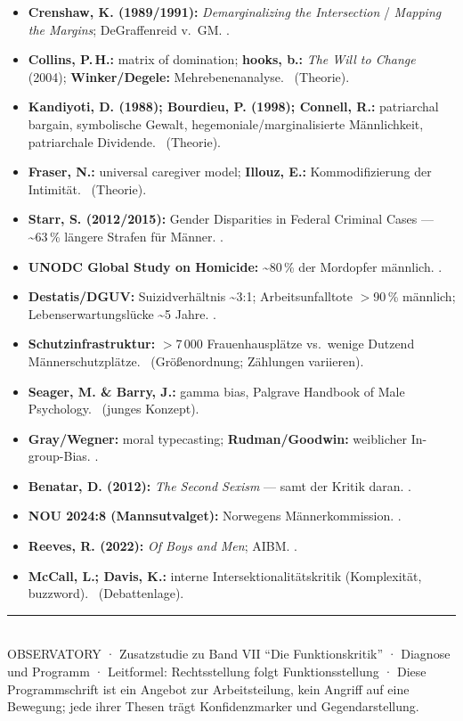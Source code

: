 \begin{itemize}
\item \textbf{Crenshaw, K. (1989/1991):} \textit{Demarginalizing the
Intersection} / \textit{Mapping the Margins}; DeGraffenreid v.\ GM. \belegt.
\item \textbf{Collins, P.\,H.:} matrix of domination; \textbf{hooks, b.:}
\textit{The Will to Change} (2004); \textbf{Winker/Degele:}
Mehrebenenanalyse. \belegt\ (Theorie).
\item \textbf{Kandiyoti, D. (1988); Bourdieu, P. (1998); Connell, R.:}
patriarchal bargain, symbolische Gewalt, hegemoniale/marginalisierte
Männlichkeit, patriarchale Dividende. \belegt\ (Theorie).
\item \textbf{Fraser, N.:} universal caregiver model; \textbf{Illouz, E.:}
Kommodifizierung der Intimität. \belegt\ (Theorie).
\item \textbf{Starr, S. (2012/2015):} Gender Disparities in Federal Criminal
Cases --- \textasciitilde 63\,\% längere Strafen für Männer. \belegt.
\item \textbf{UNODC Global Study on Homicide:} \textasciitilde 80\,\% der
Mordopfer männlich. \belegt.
\item \textbf{Destatis/DGUV:} Suizidverhältnis \textasciitilde 3:1;
Arbeitsunfalltote $>$90\,\% männlich; Lebenserwartungslücke
\textasciitilde 5 Jahre. \belegt.
\item \textbf{Schutzinfrastruktur:} $>$7\,000 Frauenhausplätze vs.\ wenige
Dutzend Männerschutzplätze. \plausibel\ (Größenordnung; Zählungen variieren).
\item \textbf{Seager, M. \& Barry, J.:} gamma bias, Palgrave Handbook of Male
Psychology. \umstritten\ (junges Konzept).
\item \textbf{Gray/Wegner:} moral typecasting; \textbf{Rudman/Goodwin:}
weiblicher In-group-Bias. \belegt.
\item \textbf{Benatar, D. (2012):} \textit{The Second Sexism} --- samt der
Kritik daran. \umstritten.
\item \textbf{NOU 2024:8 (Mannsutvalget):} Norwegens Männerkommission.
\belegt.
\item \textbf{Reeves, R. (2022):} \textit{Of Boys and Men}; AIBM. \belegt.
\item \textbf{McCall, L.; Davis, K.:} interne Intersektionalitätskritik
(Komplexität, buzzword). \belegt\ (Debattenlage).
\end{itemize}

\vspace{1em}
{\color{obsmuted}\rule{\textwidth}{0.4pt}}\\[0.4em]
{\ttfamily\scriptsize\color{obsmuted}
OBSERVATORY · Zusatzstudie zu Band VII \enquote{Die Funktionskritik} ·
Diagnose und Programm · Leitformel: Rechtsstellung folgt Funktionsstellung ·
Diese Programmschrift ist ein Angebot zur Arbeitsteilung, kein Angriff auf
eine Bewegung; jede ihrer Thesen trägt Konfidenzmarker und Gegendarstellung.}
